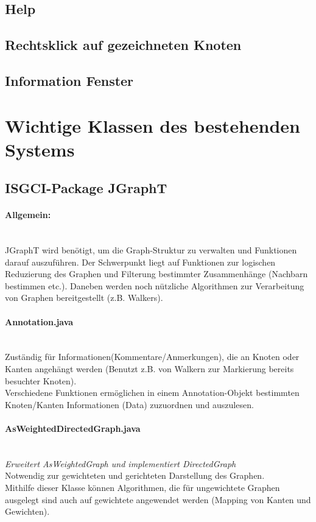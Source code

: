 \documentclass[10pt,a4paper]{article}
\begin{document}
\subsection{Help}
\subsection{Rechtsklick auf gezeichneten Knoten}
\subsection{Information Fenster}

\section{Wichtige Klassen des bestehenden Systems}
\subsection{ISGCI-Package JGraphT}

\paragraph{Allgemein:}\ \\
JGraphT wird benötigt, um die Graph-Struktur zu verwalten und Funktionen darauf auszuführen. Der Schwerpunkt liegt auf Funktionen zur logischen Reduzierung des Graphen und Filterung bestimmter Zusammenhänge (Nachbarn bestimmen etc.). Daneben werden noch nützliche Algorithmen zur Verarbeitung von Graphen bereitgestellt (z.B. Walkers).\\


\paragraph{Annotation.java}\ \\
Zuständig für Informationen(Kommentare/Anmerkungen), die an Knoten oder Kanten angehängt werden (Benutzt z.B. von Walkern zur Markierung bereits besuchter Knoten).\\
Verschiedene Funktionen ermöglichen in einem Annotation-Objekt bestimmten Knoten/Kanten Informationen (Data) zuzuordnen und auszulesen.\\

\paragraph{AsWeightedDirectedGraph.java}\ \\
\emph{Erweitert AsWeightedGraph und implementiert DirectedGraph}\\
Notwendig zur gewichteten und gerichteten Darstellung des Graphen.\\
Mithilfe dieser Klasse können Algorithmen, die für ungewichtete Graphen ausgelegt sind auch auf gewichtete angewendet werden (Mapping von Kanten und Gewichten).\\
\end{document}
